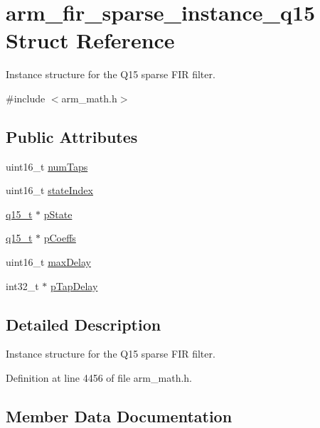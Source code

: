 \hypertarget{structarm__fir__sparse__instance__q15}{}\section{arm\+\_\+fir\+\_\+sparse\+\_\+instance\+\_\+q15 Struct Reference}
\label{structarm__fir__sparse__instance__q15}


Instance structure for the Q15 sparse F\+IR filter.  




{\ttfamily \#include $<$arm\+\_\+math.\+h$>$}

\subsection*{Public Attributes}
\begin{DoxyCompactItemize}
\item 
uint16\+\_\+t \hyperlink{structarm__fir__sparse__instance__q15_a0f66b126dd8b85f7467cfb01b7bc4d77}{num\+Taps}
\item 
uint16\+\_\+t \hyperlink{structarm__fir__sparse__instance__q15_a89487f28cab52637426024005e478985}{state\+Index}
\item 
\hyperlink{arm__math_8h_ab5a8fb21a5b3b983d5f54f31614052ea}{q15\+\_\+t} $\ast$ \hyperlink{structarm__fir__sparse__instance__q15_a98b92b0f5208110129b9a67b1db90408}{p\+State}
\item 
\hyperlink{arm__math_8h_ab5a8fb21a5b3b983d5f54f31614052ea}{q15\+\_\+t} $\ast$ \hyperlink{structarm__fir__sparse__instance__q15_a78a6565473b5f0b8c77c3f0f58a76069}{p\+Coeffs}
\item 
uint16\+\_\+t \hyperlink{structarm__fir__sparse__instance__q15_ad14cc1070eecf7e1926d8f67a8273182}{max\+Delay}
\item 
int32\+\_\+t $\ast$ \hyperlink{structarm__fir__sparse__instance__q15_aeab2855176c6efdb231a73a3672837d5}{p\+Tap\+Delay}
\end{DoxyCompactItemize}


\subsection{Detailed Description}
Instance structure for the Q15 sparse F\+IR filter. 

Definition at line 4456 of file arm\+\_\+math.\+h.



\subsection{Member Data Documentation}
\mbox{\label{structarm__fir__sparse__instance__q15_ad14cc1070eecf7e1926d8f67a8273182}} 

